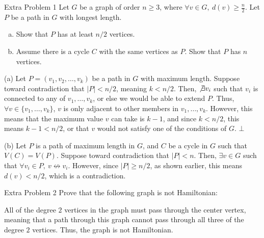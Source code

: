 \documentclass[9pt]{extarticle}
\begin{document}
  \begin{problem}{Extra Problem 1}
    Let $G$ be a graph of order $n\geq 3$, where $\forall v\in G,~d(v) \geq \frac{n}{2}$. Let $P$ be a path in $G$ with longest length.
    \begin{enumerate}[(a)]
      \item Show that $P$ has at least $n/2$ vertices.
      \item Assume there is a cycle $C$ with the same vertices as $P$. Show that $P$ has $n$ vertices.
    \end{enumerate}
    \tcblower
    \begin{problem}{(a)}
      Let $P = (v_1,v_2,\dots,v_k)$ be a path in $G$ with maximum length. Suppose toward contradiction that $|P| < n/2$, meaning $k< n/2$. Then, $\not\exists v_i$ such that $v_i$ is connected to any of $v_1,\dots,v_k$, or else we would be able to extend $P$. Thus, $\forall v\in \{v_1,\dots,v_k\}$, $v$ is only adjacent to other members in $v_1,\dots,v_k$. However, this means that the maximum value $v$ can take is $k-1$, and since $k < n/2$, this means $k-1 < n/2$, or that $v$ would not satisfy one of the conditions of $G$. $\bot$
    \end{problem}
    \begin{problem}{(b)}
      Let $P$ is a path of maximum length in $G$, and $C$ be a cycle in $G$ such that $V(C) = V(P)$. Suppose toward contradiction that $|P| < n$. Then, $\exists v\in G$ such that $\forall v_i\in P,~v\not\leftrightarrow v_i$. However, since $|P| \geq n/2$, as shown earlier, this means $d(v) < n/2$, which is a contradiction.
    \end{problem}
  \end{problem}
  \begin{problem}{Extra Problem 2}
    Prove that the following graph is not Hamiltonian:
    \begin{center}
    \end{center}
    \tcblower
    All of the degree $2$ vertices in the graph must pass through the center vertex, meaning that a path through this graph cannot pass through all three of the degree $2$ vertices. Thus, the graph is not Hamiltonian.
  \end{problem}
\end{document}
